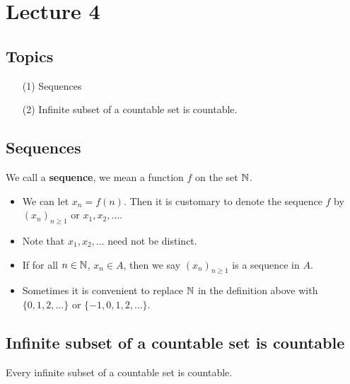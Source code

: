 \documentclass[a4paper]{report}
\begin{document}
\section{Lecture 4}

\subsection{Topics}
    \begin{enumerate}
        \item[(1)] Sequences
        \item[(2)] Infinite subset of a countable set is countable.
    \end{enumerate}
\subsection{Sequences}

\begin{definition}[Sequence]
    We call a \textbf{sequence}, we mean a function \( f  \) on the set \( \mathbb{N}  \).    
\end{definition}

\begin{itemize}
    \item We can let \( {x}_{n} = f(n) \). Then it is customary to denote the sequence \( f  \) by \( ({x}_{n})_{n \geq 1} \) or \( {x}_{1}, {x}_{2}, \dots  \).
    \item Note that \( {x}_{1}, {x}_{2}, \dots  \) need not be distinct.
    \item If for all \( n \in \mathbb{N}  \), \( {x}_{n} \in A  \), then we say \( ({x}_{n})_{n \geq1} \) is a sequence in \( A  \).
    \item Sometimes it is convenient to replace \( \mathbb{N}  \) in the definition above with \( \{ 0,1,2,\dots \}  \) or \( \{ -1,0,1,2, \dots \}  \).
\end{itemize}


\subsection{Infinite subset of a countable set is countable}

\begin{theorem}[ ]\label{Subsets of countable sets is countable}
    Every infinite subset of a countable set is countable.
\end{theorem}
\end{document}
